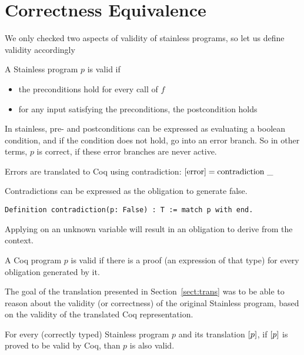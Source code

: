 \section{Correctness Equivalence}
We only checked two aspects of validity of stainless programs, so let us define validity accordingly
\begin{definition}
	A Stainless program $p$ is valid if
	
	\begin{itemize}
		\item the preconditions hold for every call of $f$
		\item for any input satisfying the preconditions, the postcondition holds
	\end{itemize}

In stainless, pre- and postconditions can be expressed as evaluating a boolean condition, and if the condition does not hold, go into an error branch. So in other terms, $p$ is correct, if these error branches are never active.
\end{definition}

Errors are translated to Coq using contradiction: $[\text{error}] = \text{contradiction} ~ \_$

Contradictions can be expressed as the obligation to generate false.

\begin{lstlisting}[style=myCoqstyle]
Definition contradiction(p: False) : T := match p with end.
\end{lstlisting} 

Applying  on an unknown variable will result in an obligation to derive  from the context.

\begin{definition}
	A Coq program $p$ is valid if there is a proof (an expression of that type) for every obligation generated by it.
\end{definition}

The goal of the translation presented in Section~\ref{sect:trans} was to be able to reason about the validity (or correctness) of the original Stainless program, based on the validity of the translated Coq representation.

\begin{theorem}
	For every (correctly typed) Stainless program $p$ and its translation $[p]$, if $[p]$ is proved to be valid by Coq, than $p$ is also valid.
\end{theorem}

